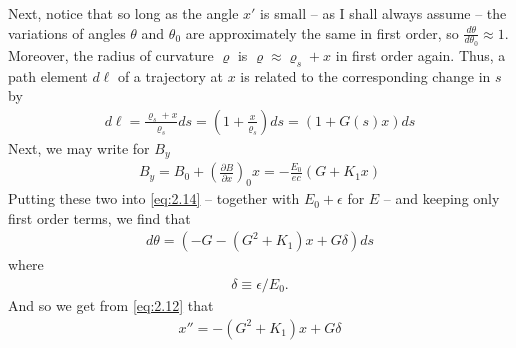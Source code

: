 Next, notice that so long as the angle $x'$ is small -- as I shall always assume -- the variations of angles $\theta$ and $\theta_0$ are approximately the same in first order, so $\frac{d\theta}{d\theta_0} \approx 1$. Moreover, the radius of curvature $\varrho$ is $\varrho \approx \varrho_s + x$ in first order again. Thus, a path element $d\ell$ of a trajectory at $x$ is related to the corresponding change in $s$ by
\begin{align}
	d\ell = \frac{\varrho_s + x}{\varrho_s} ds = \left(1+\frac{x}{\varrho_s}\right)ds = (1+G(s)x)ds\label{eq:2.15}
\end{align}
Next, we may write for $B_y$
\begin{align}
	B_y = B_0 + \left(\frac{\partial B}{\partial x}\right)_0 x = -\frac{E_0}{ec}(G+K_1x)\label{eq:2.16}
\end{align}
Putting these two into \eqref{eq:2.14} -- together with $E_0 + \epsilon$ for $E$ -- and keeping only first order terms, we find that
\begin{align*}
	d\theta = \left(-G-(G^2+K_1)x + G\delta\right)ds
\end{align*}
where
\begin{align}
	\delta \equiv \epsilon / E_0.
\end{align}
And so we get from \eqref{eq:2.12} that
\begin{align}\label{eq:2.17}
	x'' = -(G^ 2+K_1)x + G\delta
\end{align}

